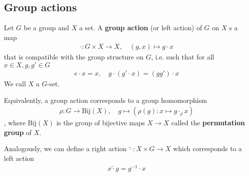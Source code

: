 \subsection{Group actions}


\begin{dfn}[]
  Let $G$ be a group and $X$ a set.
  A \textbf{group action} (or left action) of $G$ on $X$ s a map
  \begin{align*}
    \cdot: G \times X \to  X, \quad (g,x) \mapsto g \cdot x
  \end{align*}
  that is compatible with the group structure on $G$, i.e. such that for all $x \in X, g,g' \in G$
  \begin{align*}
    e \cdot x = x, \quad g \cdot (g' \cdot x) = (gg') \cdot x
  \end{align*}
  We call $X$ a $G$-set.
\end{dfn}
Equivalently, a group action corresponds to a group homomorphism
\begin{align*}
  \rho: G \to \text{Bij}(X), \quad g \mapsto  (\rho(g): x \mapsto  g \cdot_{\rho} x)
\end{align*}
, where $\text{Bij}(X)$ is the group of bijective maps $X \to  X$ called the \textbf{permutation group} of $X$.

Analogously, we can define a right action $\tilde{\cdot}: X \times G \to X$ which corresponds to a left action
\begin{align*}
  x \tilde{\cdot} g = g^{-1} \cdot x
\end{align*}

